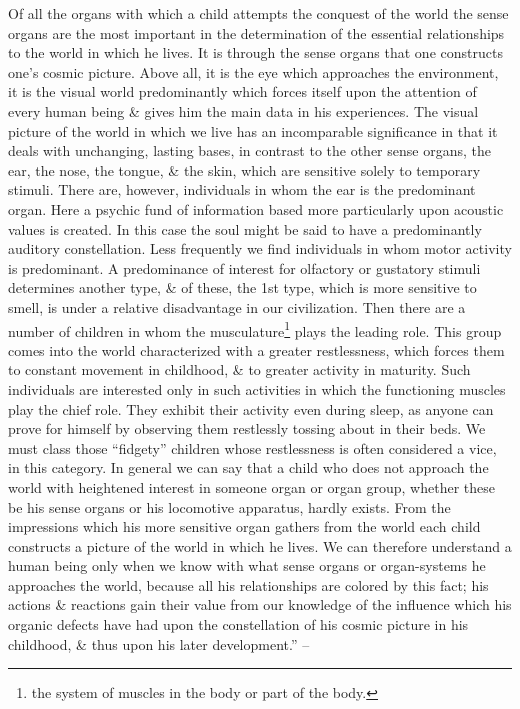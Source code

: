 \documentclass{article}
\begin{document}
Of all the organs with which a child attempts the conquest of the world the sense organs are the most important in the determination of the essential relationships to the world in which he lives. It is through the sense organs that one constructs one's cosmic picture. Above all, it is the eye which approaches the environment, it is the visual world predominantly which forces itself upon the attention of every human being \& gives him the main data in his experiences. The visual picture of the world in which we live has an incomparable significance in that it deals with unchanging, lasting bases, in contrast to the other sense organs, the ear, the nose, the tongue, \& the skin, which are sensitive solely to temporary stimuli. There are, however, individuals in whom the ear is the predominant organ. Here a psychic fund of information based more particularly upon acoustic values is created. In this case the soul might be said to have a predominantly auditory constellation. Less frequently we find individuals in whom motor activity is predominant. A predominance of interest for olfactory or gustatory stimuli determines another type, \& of these, the 1st type, which is more sensitive to smell, is under a relative disadvantage in our civilization. Then there are a number of children in whom the musculature\footnote{the system of muscles in the body or part of the body.} plays the leading role. This group comes into the world characterized with a greater restlessness, which forces them to constant movement in childhood, \& to greater activity in maturity. Such individuals are interested only in such activities in which the functioning muscles play the chief role. They exhibit their activity even during sleep, as anyone can prove for himself by observing them restlessly tossing about in their beds. We must class those ``fidgety'' children whose restlessness is often considered a vice, in this category. In general we can say that a child who does not approach the world with heightened interest in someone organ or organ group, whether these be his sense organs or his locomotive apparatus, hardly exists. From the impressions which his more sensitive organ gathers from the world each child constructs a picture of the world in which he lives. We can therefore understand a human being only when we know with what sense organs or organ-systems he approaches the world, because all his relationships are colored by this fact; his actions \& reactions gain their value from our knowledge of the influence which his organic defects have had upon the constellation of his cosmic picture in his childhood, \& thus upon his later development.'' -- \cite[pp. 44--46]{Adler_human_nature}
\end{document}

